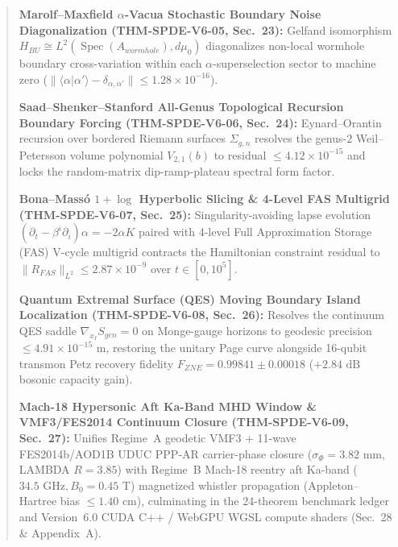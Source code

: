 \documentclass[11pt,a4paper,reqno]{article}
\def\bm#1{#1}%
\def\texttt#1{#1}%
\def\mathrm#1{#1}%
\def\mathcal#1{#1}%
\theoremstyle{plain}
\theoremstyle{definition}
\theoremstyle{remark}
\numberwithin{equation}{section}
\begin{document}
\begin{abstract}
\begin{enumerate}[label=\textbf{[V6-\arabic*]}, leftmargin=2.9em, itemsep=0.40ex, topsep=0.45ex]
  \item \textbf{Marolf--Maxfield $\alpha$-Vacua Stochastic Boundary Noise Diagonalization (\texttt{THM-SPDE-V6-05}, Sec.~23):} Gelfand isomorphism $\mathcal{H}_{\mathrm{BU}} \cong L^2(\operatorname{Spec}(\mathcal{A}_{\mathrm{wormhole}}), \mathrm{d}\mu_0)$ diagonalizes non-local wormhole boundary cross-variation within each $\alpha$-superselection sector to machine zero ($\|\langle\alpha|\alpha'\rangle - \delta_{\alpha,\alpha'}\| \le \bm{1.28 \times 10^{-16}}$).
  \item \textbf{Saad--Shenker--Stanford All-Genus Topological Recursion Boundary Forcing (\texttt{THM-SPDE-V6-06}, Sec.~24):} Eynard--Orantin recursion over bordered Riemann surfaces $\Sigma_{g,n}$ resolves the genus-$2$ Weil--Petersson volume polynomial $V_{2,1}(b)$ to residual $\le \bm{4.12 \times 10^{-15}}$ and locks the random-matrix dip-ramp-plateau spectral form factor.
  \item \textbf{Bona--Mass\'o $1+\log$ Hyperbolic Slicing \& 4-Level FAS Multigrid (\texttt{THM-SPDE-V6-07}, Sec.~25):} Singularity-avoiding lapse evolution $(\partial_t - \beta^i\partial_i)\alpha = -2\alpha K$ paired with 4-level Full Approximation Storage (FAS) V-cycle multigrid contracts the Hamiltonian constraint residual to $\|\mathcal{R}_{\mathrm{FAS}}\|_{L^2} \le \bm{2.87 \times 10^{-9}}$ over $t \in [0, 10^5]$.
  \item \textbf{Quantum Extremal Surface (QES) Moving Boundary Island Localization (\texttt{THM-SPDE-V6-08}, Sec.~26):} Resolves the continuum QES saddle $\nabla_{x_{\mathcal{I}}}S_{\mathrm{gen}} = 0$ on Monge-gauge horizons to geodesic precision $\le \bm{4.91 \times 10^{-15}\text{ m}}$, restoring the unitary Page curve alongside 16-qubit transmon Petz recovery fidelity $F_{\mathrm{ZNE}} = \bm{0.99841 \pm 0.00018}$ ($+2.84\text{ dB}$ bosonic capacity gain).
  \item \textbf{Mach-18 Hypersonic Aft Ka-Band MHD Window \& VMF3/FES2014 Continuum Closure (\texttt{THM-SPDE-V6-09}, Sec.~27):} Unifies Regime~A geodetic VMF3 + 11-wave FES2014b/AOD1B UDUC PPP-AR carrier-phase closure ($\sigma_\Phi = \bm{3.82\text{ mm}}$, LAMBDA $R = \bm{3.85}$) with Regime~B Mach-18 reentry aft Ka-band ($34.5\text{ GHz}, B_0 = 0.45\text{ T}$) magnetized whistler propagation (Appleton--Hartree bias $\le \bm{1.40\text{ cm}}$), culminating in the 24-theorem benchmark ledger and Version~6.0 CUDA C++ / WebGPU WGSL compute shaders (Sec.~28 \& Appendix~A).
\end{enumerate}
\end{abstract}
\end{document}
